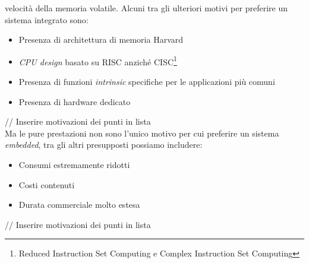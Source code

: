 velocità della memoria volatile.
Alcuni tra gli ulteriori  motivi per preferire un sistema integrato sono:
\begin{itemize}
\item Presenza di architettura di memoria Harvard
\item \emph{CPU design} basato su RISC anziché CISC\footnote{Reduced 
Instruction Set Computing e Complex Instruction Set Computing}
\item Presenza di funzioni \emph{intrinsic} specifiche per le applicazioni più 
comuni
\item Presenza di hardware dedicato
\end{itemize}
// Inserire motivazioni dei punti in lista \\
Ma le pure prestazioni non sono l'unico motivo per cui preferire un sistema 
\emph{embedded}, tra gli altri presupposti possiamo includere:
\begin{itemize}
\item Consumi estremamente ridotti
\item Costi contenuti
\item Durata commerciale molto estesa
\end{itemize}
// Inserire motivazioni dei punti in lista




\newpage
